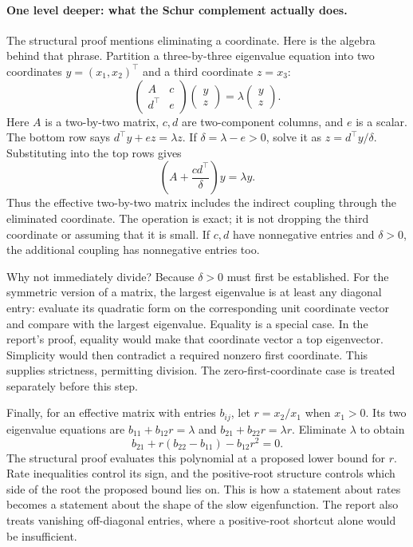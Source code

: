 \paragraph{One level deeper: what the Schur complement actually does.}
The structural proof mentions eliminating a coordinate. Here is the algebra
behind that phrase. Partition a three-by-three eigenvalue equation into
two coordinates $y=(x_1,x_2)^\top$ and a third coordinate $z=x_3$:
\[
\begin{pmatrix}A&c\\d^\top&e\end{pmatrix}
\begin{pmatrix}y\\z\end{pmatrix}
=\lambda\begin{pmatrix}y\\z\end{pmatrix}.
\]
Here $A$ is a two-by-two matrix, $c,d$ are two-component columns, and $e$
is a scalar. The bottom row says $d^\top y+ez=\lambda z$.
If $\delta=\lambda-e>0$, solve it as $z=d^\top y/\delta$.
Substituting into the top rows gives
\[
\left(A+\frac{cd^\top}{\delta}\right)y=\lambda y.
\]
Thus the effective two-by-two matrix includes the indirect coupling through
the eliminated coordinate. The operation is exact; it is not dropping the
third coordinate or assuming that it is small. If $c,d$ have nonnegative
entries and $\delta>0$, the additional coupling has nonnegative entries too.

Why not immediately divide? Because $\delta>0$ must first be established.
For the symmetric version of a matrix, the largest eigenvalue is at least
any diagonal entry: evaluate its quadratic form on the corresponding unit
coordinate vector and compare with the largest eigenvalue. Equality is a
special case. In the report's proof, equality would make that coordinate
vector a top eigenvector. Simplicity would then contradict a required
nonzero first coordinate. This supplies strictness, permitting division.
The zero-first-coordinate case is treated separately before this step.

Finally, for an effective matrix with entries $b_{ij}$, let
$r=x_2/x_1$ when $x_1>0$. Its two eigenvalue equations are
$b_{11}+b_{12}r=\lambda$ and $b_{21}+b_{22}r=\lambda r$.
Eliminate $\lambda$ to obtain
\[
b_{21}+r(b_{22}-b_{11})-b_{12}r^2=0.
\]
The structural proof evaluates this polynomial at a proposed lower bound
for $r$. Rate inequalities control its sign, and the positive-root
structure controls which side of the root the proposed bound lies on.
This is how a statement about rates becomes a statement about the shape
of the slow eigenfunction. The report also treats vanishing off-diagonal
entries, where a positive-root shortcut alone would be insufficient.

